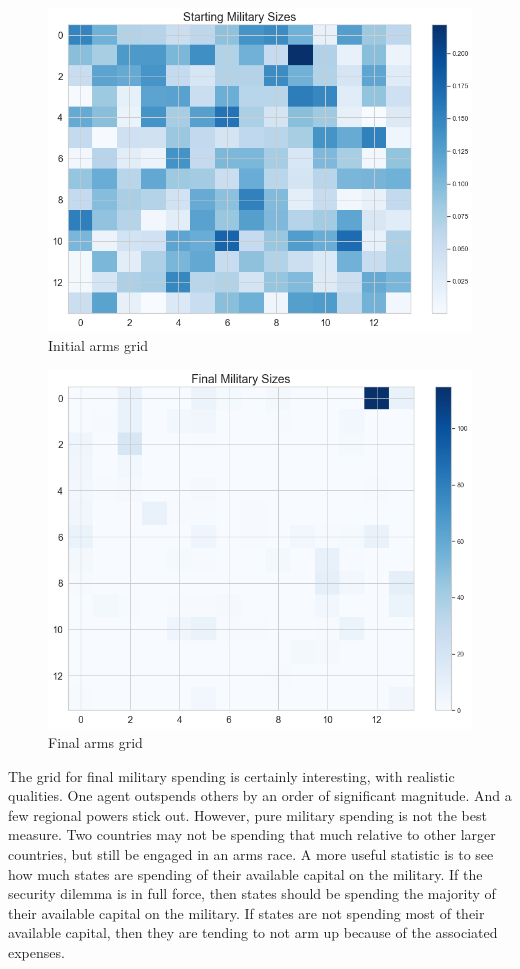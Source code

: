 \documentclass[12pt]{article}
\begin{document}
\begin{figure}
    \centering
    \includegraphics[scale = 0.45]{images/start_mil.png}
    \caption{Initial arms grid}
    \label{start_arms}
\end{figure}

\begin{figure}[!ht]
    \centering
    \includegraphics[scale = 0.45]{images/final_mil.png}
    \caption{Final arms grid}
    \label{end_arms}
\end{figure}

The grid for final military spending is certainly interesting, with realistic qualities. One agent outspends others by an order of significant magnitude. And a few regional powers stick out. However, pure military spending is not the best measure. Two countries may not be spending that much relative to other larger countries, but still be engaged in an arms race. A more useful statistic is to see how much states are spending of their available capital on the military. If the security dilemma is in full force, then states should be spending the majority of their available capital on the military. If states are not spending most of their available capital, then they are tending to not arm up because of the associated expenses. 
\end{document}
